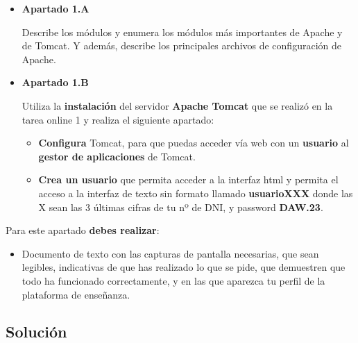 \begin{itemize}
    \item \textbf{Apartado 1.A}

    Describe los módulos y enumera los módulos más importantes de Apache y de Tomcat. Y además, describe los principales archivos de configuración de Apache.

    \item \textbf{Apartado 1.B}

    Utiliza la \textbf{instalación} del servidor \textbf{Apache Tomcat} que se realizó en la tarea online 1 y realiza el siguiente apartado:

    \begin{itemize}
        \item \textbf{Configura} Tomcat, para que puedas acceder vía web con un \textbf{usuario} al \textbf{gestor de aplicaciones} de Tomcat.
        \item \textbf{Crea un usuario} que permita acceder a  la interfaz html  y permita el acceso a la interfaz de texto sin formato llamado \textbf{usuarioXXX} donde las X sean las 3 últimas cifras de tu nº de DNI, y password \textbf{DAW.23}.
    \end{itemize}
\end{itemize}

Para este apartado \textbf{debes realizar}:
\begin{itemize}
    \item Documento de texto con las capturas de pantalla necesarias, que sean legibles, indicativas de que has realizado lo que se pide, que demuestren que todo ha funcionado correctamente, y en las que aparezca tu perfil de la plataforma de enseñanza.
\end{itemize}

\subsection{Solución}





%
%

